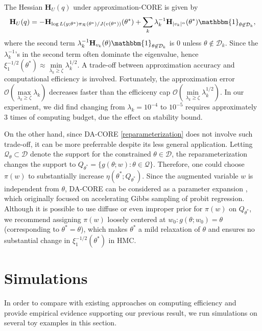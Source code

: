 \documentclass[10pt,fleqn]{article}
\newcommand{\mc}[1]{\mathcal{#1}}
\DeclareMathOperator{\1}{\mathbbm{1}}
\newcommand{\hess}{\mathbf{H}} %
\begin{document}
The Hessian $\hess_U(q)$ under approximation-CORE is given by
\begin{equation}
\label{eq:hessian_extrinsic}
\hess_U(q) = -\hess_{\log L(y;\theta^*) \pi_{\mc
R}(\theta^*) /J(v(\theta^*)) }(\theta^*)+\sum_k \lambda_k^{-1} \hess_{|v_k|^\alpha}(\theta^*) \mathbbm{1}_{\theta\not\in \mc D_k},
\end{equation}
where the second term $\lambda_k^{-1} \hess_{v_k}(\theta) \mathbbm{1}_{\theta\not\in \mc D_k}$ is $0$ unless $\theta\not\in \mc D_k$. Since the $\lambda^{-1}_k$'s
in the second term often dominate the eigenvalue, hence $\xi^{-1/2}_1(\theta^*)\approx
\underset{\lambda_k\ge \zeta}{\min}\lambda_k^{1/2}$. A trade-off between approximation accuracy and computational efficiency is involved. Fortunately, the approximation error $\mc O( \underset{\lambda_k\ge \zeta}{\max}\lambda_k)$ decreases faster than the efficiceny cap $\mc O( \underset{\lambda_k\ge \zeta}{\min}\lambda_k^{1/2})$. In our experiment, we did find changing from $\lambda_{k}=10^{-4}$ to $10^{-5}$ requires approximately $3$ times of computing budget, due the effect on stability
bound.


On the other hand, since DA-CORE \eqref{reparameterization} does not involve such trade-off, it can be more preferrable despite its less
general application. Letting $\mc Q_\theta\subset \mc D$ denote the support for the constrained $\theta\in \mc D$, the reparameterization changes the support to $Q_{\theta^*}=\{g(\theta;w):\theta\in \mc Q\}$. Therefore, one could choose $\pi(w)$ to substantially increase $\eta(\theta^*; Q_{\theta^*})$.
Since the augmented variable $w$ is independent from $\theta$, DA-CORE can
be considered as a parameter expansion  \citep{liu1999parameter}, which originally
focused on accelerating  Gibbs sampling of probit regression. Although  it is possible to use diffuse or even improper prior for $\pi(w)$ on $Q_{\theta^*}$,
 we recommend assigning $\pi(w)$ loosely centered at $w_0:g(\theta;w_0)=\theta$ (corresponding to $\theta^*=\theta$), which makes $\theta^*$ a mild relaxation of $\theta$
and ensures no substantial change in $\xi^{-1/2}_1(\theta^*)$ in HMC.

\section{Simulations}
In order to compare with existing approaches on computing efficiency and provide empirical evidence
supporting our previous result, we run simulations on several toy examples
 in this section.
   
\end{document}
